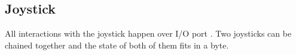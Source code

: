 \documentclass[book.tex]{subfiles}
\begin{document}
\addtocounter{footnote}{-1}

\subsection{Joystick}
All interactions with the joystick happen over I/O port . Two joysticks can be chained together and the state of both of them fits in a byte.\\ 
\par
\begin{minipage}{\textwidth}

\end{minipage}
\par
\end{document}
